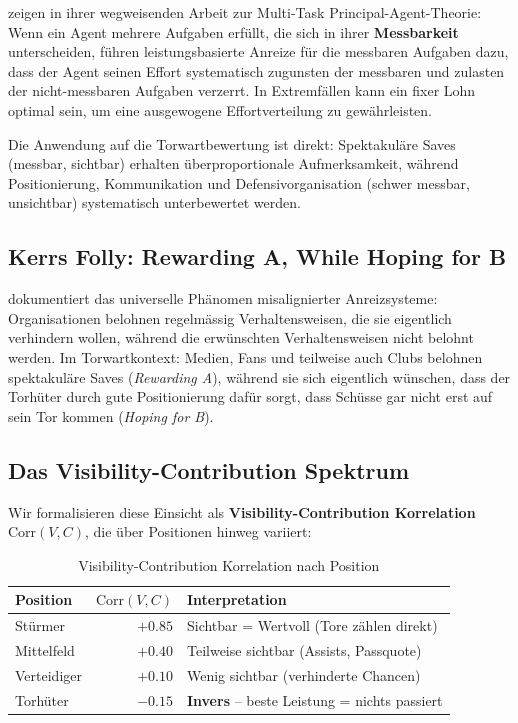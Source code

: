 \documentclass[12pt,a4paper]{article}
\begin{document}
\citet{holmstrom1991} zeigen in ihrer wegweisenden Arbeit zur Multi-Task Principal-Agent-Theorie: Wenn ein Agent mehrere Aufgaben erf\"ullt, die sich in ihrer \textbf{Messbarkeit} unterscheiden, f\"uhren leistungsbasierte Anreize f\"ur die messbaren Aufgaben dazu, dass der Agent seinen Effort systematisch zugunsten der messbaren und zulasten der nicht-messbaren Aufgaben verzerrt. In Extremf\"allen kann ein fixer Lohn optimal sein, um eine ausgewogene Effortverteilung zu gew\"ahrleisten.

Die Anwendung auf die Torwartbewertung ist direkt: Spektakul\"are Saves (messbar, sichtbar) erhalten \"uberproportionale Aufmerksamkeit, w\"ahrend Positionierung, Kommunikation und Defensivorganisation (schwer messbar, unsichtbar) systematisch unterbewertet werden.

\subsection{Kerrs Folly: Rewarding A, While Hoping for B}
\label{sec:kerr}

\citet{kerr1975} dokumentiert das universelle Ph\"anomen misalignierter Anreizsysteme: Organisationen belohnen regelm\"assig Verhaltensweisen, die sie eigentlich verhindern wollen, w\"ahrend die erw\"unschten Verhaltensweisen nicht belohnt werden. Im Torwartkontext: Medien, Fans und teilweise auch Clubs belohnen spektakul\"are Saves (\emph{Rewarding A}), w\"ahrend sie sich eigentlich w\"unschen, dass der Torh\"uter durch gute Positionierung daf\"ur sorgt, dass Sch\"usse gar nicht erst auf sein Tor kommen (\emph{Hoping for B}).

\subsection{Das Visibility-Contribution Spektrum}
\label{sec:vc-spectrum}

Wir formalisieren diese Einsicht als \textbf{Visibility-Contribution Korrelation} $\text{Corr}(V,C)$, die \"uber Positionen hinweg variiert:

\begin{table}[H]
\centering
\caption{Visibility-Contribution Korrelation nach Position}
\label{tab:vc-spectrum}
\begin{tabular}{@{}lrl@{}}
\toprule
\textbf{Position} & $\text{Corr}(V,C)$ & \textbf{Interpretation} \\
\midrule
St\"urmer     & $+0.85$ & Sichtbar = Wertvoll (Tore z\"ahlen direkt) \\
Mittelfeld   & $+0.40$ & Teilweise sichtbar (Assists, Passquote) \\
Verteidiger  & $+0.10$ & Wenig sichtbar (verhinderte Chancen) \\
Torh\"uter    & $-0.15$ & \textbf{Invers} -- beste Leistung = nichts passiert \\
\bottomrule
\end{tabular}
\end{table}
\end{document}
